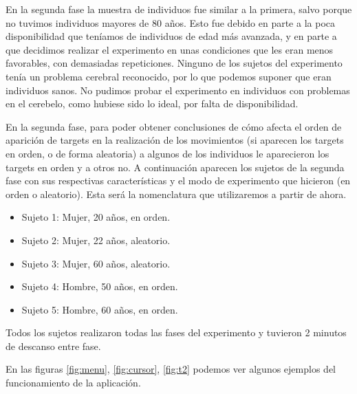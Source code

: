 \documentclass[a4paper,11pt, oneside]{book}
\begin{document}
En la segunda fase la muestra de individuos fue similar a la primera, salvo porque no tuvimos individuos mayores de 80 años. Esto fue debido en parte a la poca disponibilidad que teníamos de individuos de edad más avanzada, y en parte a que decidimos realizar el experimento en unas condiciones que les eran menos favorables, con demasiadas repeticiones. Ninguno de los sujetos del experimento tenía un problema cerebral reconocido, por lo que podemos suponer que eran individuos sanos. No pudimos probar el experimento en individuos con problemas en el cerebelo, como hubiese sido lo ideal, por falta de disponibilidad.


En la segunda fase, para poder obtener conclusiones de cómo afecta el orden de aparición de targets en la realización de los movimientos (si aparecen los targets en orden, o de forma aleatoria) a algunos de los individuos le aparecieron los targets en orden y a otros no. A continuación aparecen los sujetos de la segunda fase con sus respectivas características y el modo de experimento que hicieron (en orden o aleatorio). Esta será la nomenclatura que utilizaremos a partir de ahora.

\begin{itemize}
	\item Sujeto 1: Mujer, 20 años, en orden.
	\item Sujeto 2: Mujer, 22 años, aleatorio.
	\item Sujeto 3: Mujer, 60 años, aleatorio.
	\item Sujeto 4: Hombre, 50 años, en orden.
	\item Sujeto 5: Hombre, 60 años, en orden.
\end{itemize}

Todos los sujetos realizaron todas las fases del experimento y tuvieron 2 minutos de descanso entre fase.

En las figuras \ref{fig:menu}, \ref{fig:cursor}, \ref{fig:t2} podemos ver algunos ejemplos del funcionamiento de la aplicación.
\end{document}
